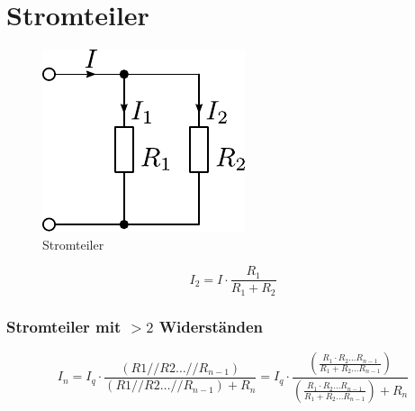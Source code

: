 



\newpage
\section{Stromteiler}
\begin{figure}[h!]
	\centering
	\includegraphics[scale=\schscale]{../fig/iteil.pdf}
	\caption{Stromteiler}
	\label{sch:iteil}
\end{figure}
\[ I_2 = I \cdot \frac{R_1}{R_1 + R_2} \]

\subsubsection{Stromteiler mit $> 2$ Widerständen}
\[ I_n = I_q \cdot \frac{(R1 // R2 \dots // R_{n-1})}
{(R1 // R2 \dots // R_{n-1}) + R_n} 
= I_q \cdot \frac{\left(\frac{R_1 \cdot R_2 \dots R_{n-1}}
{R_1 + R_2 \dots R_{n-1}}\right)}
{\left(\frac{R_1 \cdot R_2 \dots R_{n-1}}
{R_1 + R_2 \dots R_{n-1}}\right) + R_n} \]
